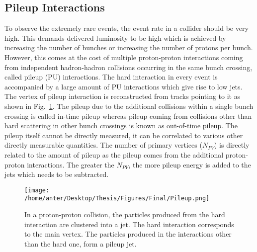 \subsection{Pileup Interactions}
To observe the extremely rare events, the event rate in a collider should be very high. This demands delivered luminosity to be high which is achieved by increasing the number of bunches or increasing the number of protons per bunch. However, this comes at the cost of multiple proton-proton interactions coming from independent hadron-hadron collisions occurring in the same bunch crossing, called pileup (PU) interactions. The hard interaction in every event is accompanied by a large amount of PU interactions which give rise to low \pt jets. The vertex of pileup interaction is reconstructed from tracks pointing to it as shown in Fig.~\ref{fig:pileup_d}. The pileup due to the additional collisions within a single bunch crossing is called in-time pileup whereas pileup coming from collisions other than hard scattering in other bunch crossings is known as out-of-time pileup. The pileup itself cannot be directly measured, it can be correlated to various other directly measurable quantities. The number of primary vertices ($N_{PV}$) is directly related to the amount of pileup as the pileup comes from the additional proton-proton interactions. The greater the $N_{PV}$, the more pileup energy is added to the jets which needs to be subtracted. 
\begin{figure}[!h]
 \begin{center}
 \vspace*{4mm} 
 \texttt{[image: /home/anter/Desktop/Thesis/Figures/Final/Pileup.png]}\\
 \vspace*{5mm}
 \caption[In a proton-proton collision, the particles produced from the hard interaction are clustered into a jet. The hard interaction corresponds to the main vertex. The particles produced in the interactions other than the hard one, form a pileup jet.]{In a proton-proton collision, the particles produced from the hard interaction are clustered into a jet. The hard interaction corresponds to the main vertex. The particles produced in the interactions other than the hard one, form a pileup jet\footnotemark.}
 \label{fig:pileup_d}
 \end{center}
\end{figure}

